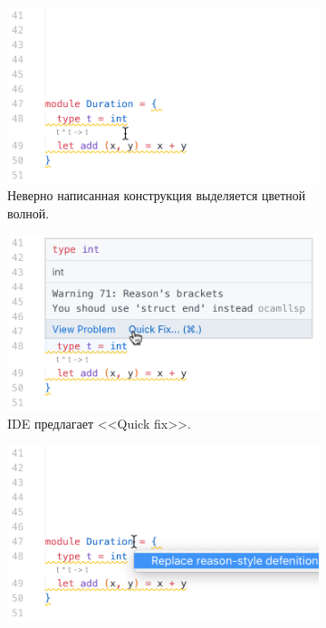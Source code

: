 \begin{figure}[h]
	\begin{subfigure}[t]{0.5\textwidth}
		\includegraphics[width=\linewidth]{screenshots/01.png}
		\caption{Неверно написанная конструкция выделяется цветной волной.}
	\end{subfigure}
	\begin{subfigure}[t]{0.5\textwidth}
		\includegraphics[width=\linewidth]{screenshots/02.png}
		\caption{IDE предлагает <<Quick fix>>.}
	\end{subfigure}
	\newline
	\begin{subfigure}{0.5\textwidth}
		\includegraphics[width=\linewidth]{screenshots/03.png}

\end{subfigure}
\end{figure}
